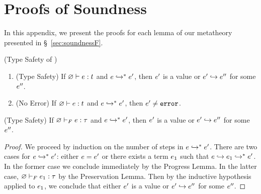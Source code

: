 \chapter{Proofs of \sysf Soundness}
\label{ch:proofsF}
\label{sec:proofsF}
%
In this appendix, we present the proofs for 
each lemma of our \sysf metatheory presented in \S~\ref{sec:soundnessF}.
%
\begin{theorem} (Type Safety of \sysf) 
  \label{app:lem:soundnessF}
  \begin{enumerate}
      \item (Type Safety)
      If ${\varnothing} \vdash {\ensuremath{e}} : {t}$ and ${e} \hookrightarrow^{*} {e'}$,
      then $e'$ is a value or $e' \hookrightarrow e''$
      for some $e''$.
      \item (No Error)
      If ${\varnothing} \vdash {\ensuremath{e}} : {t}$ and ${e} \hookrightarrow^{*} {e'}$,
      then $e' \not = \texttt{error}$.
  \end{enumerate}
  \end{theorem}
\begin{theorem} (Type Safety)
    If ${\varnothing} \vdash_F {e} : {\tau}$ and ${e} \hookrightarrow^{*} {e'}$,
    then $e'$ is a value or $e' \hookrightarrow e''$ 
    for some $e''$. 
\end{theorem}
\begin{proof}
We proceed by induction on the number of steps in ${e} \hookrightarrow^{*} {e'}$.
There are two cases for ${e} \hookrightarrow^{*} {e'}$: either $e=e'$ 
or there exists a term $e_1$ 
such that $\sexpr \step \evalsTo{\sexpr_1}{\sexpr'}$.
In the former case we conclude immediately by the Progress Lemma.
In the latter case, ${\varnothing} \vdash_F {e_1} : {\tau}$
by the Preservation Lemma. Then by the inductive hypothesis
applied to $e_1$, we conclude that either $e'$ is a value 
or $e' \hookrightarrow e''$ for some $e''$. 
\end{proof}
